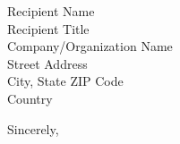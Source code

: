 \documentclass[11pt]{letter}
\begin{document}
\begin{letter}{
    Recipient Name \\
    Recipient Title \\
    Company/Organization Name \\
    Street Address \\
    City, State ZIP Code \\
    Country
}
\closing{Sincerely,}








\end{letter}
\end{document}
